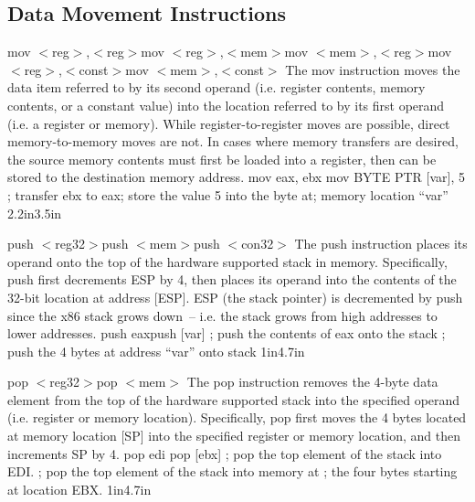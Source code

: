 \subsection{Data Movement Instructions}
\label{data-movement-instructions.sec}

{mov $<$reg$>$,$<$reg$>$\newline mov $<$reg$>$,$<$mem$>$\newline mov $<$mem$>$,$<$reg$>$\newline mov $<$reg$>$,$<$const$>$\newline mov $<$mem$>$,$<$const$>$}
{The mov instruction moves the data item referred to by its second
  operand (i.e.  register contents, memory contents, or a constant
  value) into the location referred to by its first operand (i.e. a
  register or memory). While register-to-register moves are possible,
  direct memory-to-memory moves are not. In cases where memory
  transfers are desired, the source memory contents must first be
  loaded into a register, then can be stored to the destination memory
  address.}
{mov eax, ebx \linebreak mov BYTE PTR [var], 5 }
{; transfer ebx to eax\linebreak; store the value 5 into the byte at\linebreak; memory location ``var''}
{2.2in}{3.5in}

{push $<$reg32$>$\newline push $<$mem$>$\newline push $<$con32$>$}
{The push instruction places its operand onto the top of the hardware supported
stack in memory. Specifically, push first decrements ESP by 4, then places its
operand into the contents of the 32-bit location at address [ESP]. ESP (the stack
pointer) is decremented by push since the x86 stack grows down~-- i.e. the stack
grows from high addresses to lower addresses.}
{push eax\newline push [var]}
{; push the contents of eax onto the stack\newline
; push the 4 bytes at address ``var'' onto stack}
{1in}{4.7in}

{pop $<$reg32$>$\newline pop $<$mem$>$}
{The pop instruction removes the 4-byte data element from the top of
  the hardware supported stack into the specified operand (i.e.
  register or memory location). Specifically, pop first moves the 4
  bytes located at memory location [SP] into the specified register or
  memory location, and then increments SP by 4.}
{pop edi \newline pop [ebx]}
{; pop the top element of the stack into EDI.\newline
; pop the top element of the stack into memory at\newline
; the four bytes starting at location EBX.}
{1in}{4.7in}

